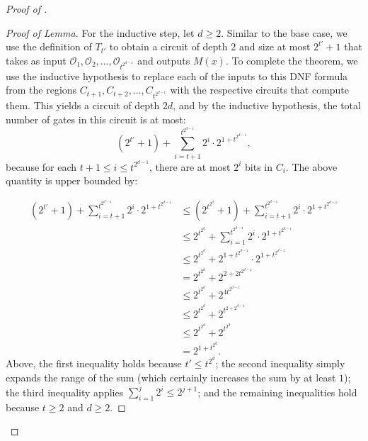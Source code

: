 \documentclass[11pt]{article}%
\begin{document}
\begin{proof}[Proof of ]
\begin{proof}[Proof of Lemma]
For the inductive step, let $d \ge 2$. Similar to the base case, we use the definition of $T_{t'}$ to obtain a circuit of depth $2$ and size at most $2^{t'} + 1$ that takes as input $\mathcal{O}_1,\mathcal{O}_2,\ldots,\mathcal{O}_{t^{2^{d-1}}}$ and outputs $M(x)$. To complete the theorem, we use the inductive hypothesis to replace each of the inputs to this DNF formula from the regions $C_{t+1},C_{t+2},\ldots,C_{t^{2^{d-1}}}$ with the respective circuits that compute them. This yields a circuit of depth $2d$, and by the inductive hypothesis, the total number of gates in this circuit is at most:
\[
\left(2^{t'} + 1\right) + \sum_{i=t+1}^{t^{2^{d-1}}} 2^{i} \cdot 2^{1 + t^{2^{d-1}}},
\]
because for each $t+1 \le i \le t^{2^{d-1}}$, there are at most $2^i$ bits in $C_i$. The above quantity is upper bounded by:

\begin{align*}
\left(2^{t'} + 1\right) + \sum_{i=t+1}^{t^{2^{d-1}}} 2^{i} \cdot 2^{1 + t^{2^{d-1}}}
&\le \left(2^{t^{2^d}} + 1\right) + \sum_{i=t+1}^{t^{2^{d-1}}} 2^{i} \cdot 2^{1 + t^{2^{d-1}}}\\
&\le 2^{t^{2^d}} + \sum_{i=1}^{t^{2^{d-1}}} 2^{i} \cdot 2^{1 + t^{2^{d-1}}}\\
&\le 2^{t^{2^d}} + 2^{1 + t^{2^{d-1}}} \cdot 2^{1 + t^{2^{d-1}}}\\
&= 2^{t^{2^d}} + 2^{2 + 2t^{2^{d-1}}}\\
&\le 2^{t^{2^d}} + 2^{4t^{2^{d-1}}}\\
&\le 2^{t^{2^d}} + 2^{t^{2 + 2^{d-1}}}\\
&\le 2^{t^{2^d}} + 2^{t^{2^d}}\\
&= 2^{1 + t^{2^d}}.
\end{align*}
Above, the first inequality holds because $t' \le t^{2^d}$; the second inequality simply expands the range of the sum (which certainly increases the sum by at least $1$); the third inequality applies $\sum_{i=1}^j 2^i \le 2^{j+1}$; and the remaining inequalities hold because $t \ge 2$ and $d \ge 2$.
\end{proof}



\end{proof}
\end{document}
